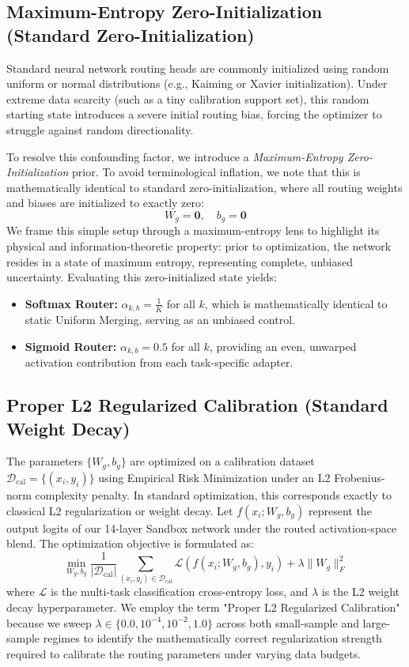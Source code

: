 \subsection{Maximum-Entropy Zero-Initialization (Standard Zero-Initialization)}
Standard neural network routing heads are commonly initialized using random uniform or normal distributions (e.g., Kaiming or Xavier initialization). Under extreme data scarcity (such as a tiny calibration support set), this random starting state introduces a severe initial routing bias, forcing the optimizer to struggle against random directionality. 

To resolve this confounding factor, we introduce a \emph{Maximum-Entropy Zero-Initialization} prior. To avoid terminological inflation, we note that this is mathematically identical to standard zero-initialization, where all routing weights and biases are initialized to exactly zero:
\begin{equation}
    W_g = \mathbf{0}, \quad b_g = \mathbf{0}
\end{equation}
We frame this simple setup through a maximum-entropy lens to highlight its physical and information-theoretic property: prior to optimization, the network resides in a state of maximum entropy, representing complete, unbiased uncertainty. Evaluating this zero-initialized state yields:
\begin{itemize}
    \item \textbf{Softmax Router:} $\alpha_{k, b} = \frac{1}{K}$ for all $k$, which is mathematically identical to static Uniform Merging, serving as an unbiased control.
    \item \textbf{Sigmoid Router:} $\alpha_{k, b} = 0.5$ for all $k$, providing an even, unwarped activation contribution from each task-specific adapter.
\end{itemize}

\subsection{Proper L2 Regularized Calibration (Standard Weight Decay)}
The parameters $\{W_g, b_g\}$ are optimized on a calibration dataset $\mathcal{D}_{\text{cal}} = \{(x_i, y_i)\}$ using Empirical Risk Minimization under an L2 Frobenius-norm complexity penalty. In standard optimization, this corresponds exactly to classical L2 regularization or weight decay. Let $f(x_i; W_g, b_g)$ represent the output logits of our 14-layer Sandbox network under the routed activation-space blend. The optimization objective is formulated as:
\begin{equation}
    \min_{W_g, b_g} \frac{1}{|\mathcal{D}_{\text{cal}}|} \sum_{(x_i, y_i) \in \mathcal{D}_{\text{cal}}} \mathcal{L}\left( f(x_i; W_g, b_g), y_i \right) + \lambda \|W_g\|_F^2
\end{equation}
where $\mathcal{L}$ is the multi-task classification cross-entropy loss, and $\lambda$ is the L2 weight decay hyperparameter. We employ the term "Proper L2 Regularized Calibration" because we sweep $\lambda \in \{0.0, 10^{-4}, 10^{-2}, 1.0\}$ across both small-sample and large-sample regimes to identify the mathematically correct regularization strength required to calibrate the routing parameters under varying data budgets.

